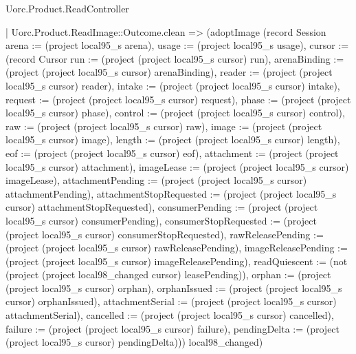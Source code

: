 \begin{lexlean}{Uorc.Product.ReadController}
\begin{semanticmodule}
{      | Uorc.Product.ReadImage::Outcome.clean => (adoptImage (record Session {arena := (project local95_s arena), usage := (project local95_s usage), cursor := (record Cursor {run := (project (project local95_s cursor) run), arenaBinding := (project (project local95_s cursor) arenaBinding), reader := (project (project local95_s cursor) reader), intake := (project (project local95_s cursor) intake), request := (project (project local95_s cursor) request), phase := (project (project local95_s cursor) phase), control := (project (project local95_s cursor) control), raw := (project (project local95_s cursor) raw), image := (project (project local95_s cursor) image), length := (project (project local95_s cursor) length), eof := (project (project local95_s cursor) eof), attachment := (project (project local95_s cursor) attachment), imageLease := (project (project local95_s cursor) imageLease), attachmentPending := (project (project local95_s cursor) attachmentPending), attachmentStopRequested := (project (project local95_s cursor) attachmentStopRequested), consumerPending := (project (project local95_s cursor) consumerPending), consumerStopRequested := (project (project local95_s cursor) consumerStopRequested), rawReleasePending := (project (project local95_s cursor) rawReleasePending), imageReleasePending := (project (project local95_s cursor) imageReleasePending), readQuiescent := (not (project (project local98_changed cursor) leasePending)), orphan := (project (project local95_s cursor) orphan), orphanIssued := (project (project local95_s cursor) orphanIssued), attachmentSerial := (project (project local95_s cursor) attachmentSerial), cancelled := (project (project local95_s cursor) cancelled), failure := (project (project local95_s cursor) failure), pendingDelta := (project (project local95_s cursor) pendingDelta)})}) local98_changed)
}
\end{semanticmodule}
\end{lexlean}
